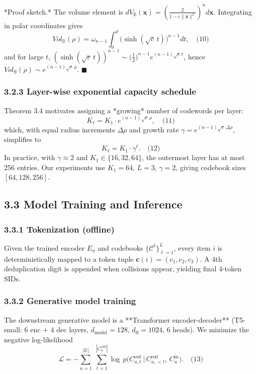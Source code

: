 \documentclass[11pt]{article}
\begin{document}
*Proof sketch.* The volume element is $dV_{\mathbb{B}}(\mathbf{x}) = \left(\frac{2}{1 - c\|\mathbf{x}\|^2}\right)^{\!n} d\mathbf{x}$. Integrating in polar coordinates gives
\[Vol_{\mathbb{B}}(\rho) = \omega_{n-1} \int_0^\rho \bigl(\sinh(\sqrt{c}\, t)\bigr)^{n-1} dt,\quad\text{(10)}\]
and for large $t$, $(\sinh(\sqrt{c}\, t))^{n-1} \sim \bigl(\tfrac{1}{2}\bigr)^{n-1} e^{(n-1)\sqrt{c}\, t}$, hence $Vol_{\mathbb{B}}(\rho) \sim e^{(n-1)\sqrt{c}\,\rho}$. $\blacksquare$


\subsubsection{3.2.3 Layer-wise exponential capacity schedule}

Theorem 3.4 motivates assigning a *growing* number of codewords per layer:
\[K_\ell = K_1 \cdot e^{(n-1)\sqrt{c}\,\rho},\quad\text{(11)}\]
which, with equal radius increments $\Delta\rho$ and growth rate $\gamma = e^{(n-1)\sqrt{c}\,\Delta\rho}$, simplifies to
\[K_\ell = K_1 \cdot \gamma^\ell.\quad\text{(12)}\]
In practice, with $\gamma \approx 2$ and $K_1 \in \{16, 32, 64\}$, the outermost layer has at most 256 entries. Our experiments use $K_1 = 64$, $L = 3$, $\gamma = 2$, giving codebook sizes $[64, 128, 256]$.


\subsection{3.3 Model Training and Inference}


\subsubsection{3.3.1 Tokenization (offline)}

Given the trained encoder $E_\phi$ and codebooks $\{\mathcal{C}^\ell\}_{\ell=1}^{L}$, every item $i$ is deterministically mapped to a token tuple $\mathbf{c}(i) = (c_1, c_2, c_3)$. A 4th deduplication digit is appended when collisions appear, yielding final 4-token SIDs.


\subsubsection{3.3.2 Generative model training}

The downstream generative model is a **Transformer encoder-decoder** (T5-small: 6 enc + 4 dec layers, $d_{\text{model}}=128$, $d_{\text{ff}}=1024$, 6 heads). We minimize the negative log-likelihood
\[\mathcal{L} = - \sum_{u=1}^{|\mathcal{U}|}\;\sum_{t=1}^{|C^{\mathrm{out}}_u|} \log\, p\bigl(C^{\mathrm{out}}_{u,t} \,\big|\, C^{\mathrm{out}}_{u,<t},\, C^{\mathrm{in}}_u\bigr).\quad\text{(13)}\]
\end{document}
